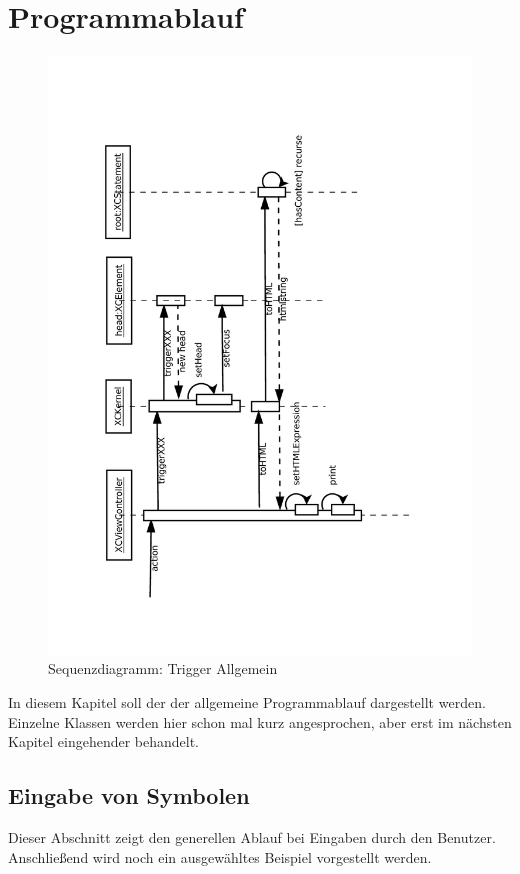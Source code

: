 \chapter{Programmablauf}

\begin{figure}[H]
	\centering
	\label{dia:sq:trigger}
	\includegraphics[angle=270, width=1\textwidth]{sq_trigger.pdf}
	\caption{Sequenzdiagramm: Trigger Allgemein}
\end{figure}
In diesem Kapitel soll der der allgemeine Programmablauf dargestellt werden.
Einzelne Klassen werden hier schon mal kurz angesprochen, aber erst im nächsten Kapitel eingehender behandelt.
\section{Eingabe von Symbolen}
Dieser Abschnitt zeigt den generellen Ablauf bei Eingaben durch den Benutzer. Anschließend wird noch ein ausgewähltes Beispiel vorgestellt werden.
